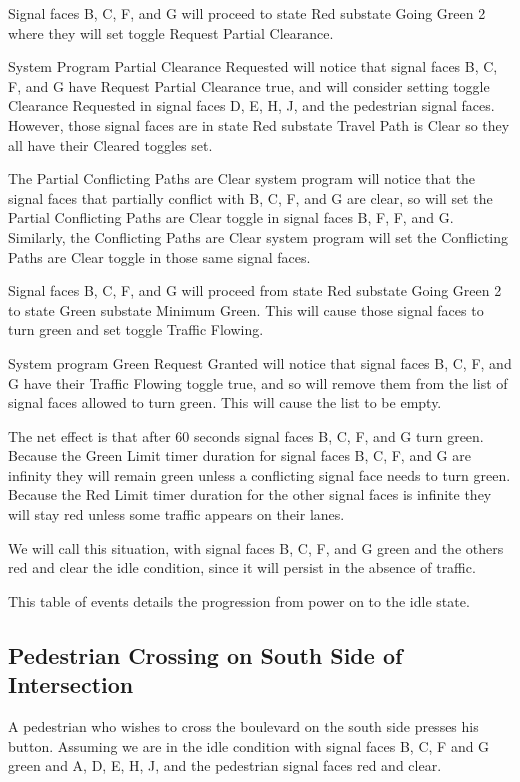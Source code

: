 \documentclass[letterpaper,twoside]{article}
\begin{document}
Signal faces B, C, F, and G will proceed to state Red
substate Going Green 2 where they will set toggle Request Partial Clearance.

System Program Partial Clearance Requested will notice that signal faces
B, C, F, and G have Request Partial Clearance true,
and will consider setting toggle Clearance
Requested in signal faces D, E, H, J, and the pedestrian signal faces.
However, those signal faces
are in state Red substate Travel Path is Clear so they all have their
Cleared toggles set.

The Partial Conflicting Paths are Clear system program will notice that the
signal faces that partially conflict with B, C, F, and G are clear,
so will set the
Partial Conflicting Paths are Clear toggle in signal faces B, F, F, and G.
Similarly, the Conflicting Paths are Clear system program will set
the Conflicting Paths are Clear toggle in those same signal faces.

Signal faces B, C, F, and G will proceed from state Red substate
Going Green 2 to state Green substate Minimum Green.
This will cause those signal faces to turn green and set toggle
Traffic Flowing.

System program Green Request Granted will notice that signal faces
B, C, F, and G have their Traffic Flowing toggle true,
and so will remove them from the list of signal faces allowed to turn green.
This will cause the list to be empty.

The net effect is that after 60 seconds signal faces
B, C, F, and G turn green.  Because the Green Limit timer duration for signal
faces B, C, F, and G are infinity they will remain green unless
a conflicting signal face needs to turn green.  Because the Red Limit
timer duration for the other signal faces is infinite they will stay red
unless some traffic appears on their lanes.

We will call this situation, with signal faces B, C, F, and G green
and the others red and clear the idle condition, since it will persist
in the absence of traffic.

This table of events details the progression from power on to the idle state.



\subsection{Pedestrian Crossing on South Side of Intersection}
A pedestrian who wishes to cross the boulevard on the south side
presses his button.  Assuming we are in the idle condition
with signal faces
B, C, F and G green and A, D, E, H, J, and the pedestrian signal faces
red and clear.
\end{document}
